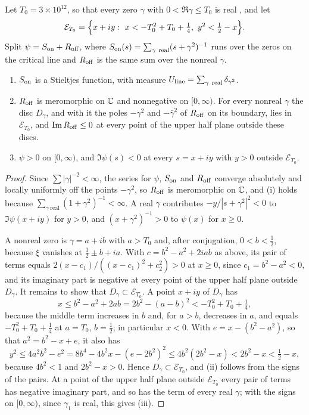 \begin{theorem}[unconditional]\label{bs:thm:local}
Let $T_0=3\times10^{12}$, so that every zero $\gamma$ with $0<\Re\gamma\le T_0$ is real \cite{PT21}, and let
\[
\mathcal E_{T_0}=\Bigl\{x+iy:\ x<-T_0^2+T_0+\tfrac14,\ y^2<\tfrac12-x\Bigr\}.
\]
Split $\psi=S_{\rm on}+R_{\rm off}$, where $S_{\rm on}(s)=\sum_{\gamma\ \mathrm{real}}(s+\gamma^2)^{-1}$ runs over the zeros on the critical line and $R_{\rm off}$ is the same sum over the nonreal $\gamma$.
\begin{enumerate}
\item[(i)] $S_{\rm on}$ is a Stieltjes function, with measure $U_{\rm line}=\sum_{\gamma\ \mathrm{real}}\delta_{\gamma^2}$.
\item[(ii)] $R_{\rm off}$ is meromorphic on $\C$ and nonnegative on $[0,\infty)$. For every nonreal $\gamma$ the disc $D_\gamma$, and with it the poles $-\gamma^2$ and $-\bar\gamma^2$ of $R_{\rm off}$ on its boundary, lies in $\mathcal E_{T_0}$, and $\Im R_{\rm off}\le0$ at every point of the upper half plane outside these discs.
\item[(iii)] $\psi>0$ on $[0,\infty)$, and $\Im\psi(s)<0$ at every $s=x+iy$ with $y>0$ outside $\mathcal E_{T_0}$.
\end{enumerate}
\end{theorem}

\begin{proof}
Since $\sum|\gamma|^{-2}<\infty$, the series for $\psi$, $S_{\rm on}$ and $R_{\rm off}$ converge absolutely and locally uniformly off the points $-\gamma^2$, so $R_{\rm off}$ is meromorphic on $\C$, and (i) holds because $\sum_{\gamma\ \mathrm{real}}(1+\gamma^2)^{-1}<\infty$. A real $\gamma$ contributes $-y/|s+\gamma^2|^2<0$ to $\Im\psi(x+iy)$ for $y>0$, and $(x+\gamma^2)^{-1}>0$ to $\psi(x)$ for $x\ge0$.

A nonreal zero is $\gamma=a+ib$ with $a>T_0$ and, after conjugation, $0<b<\frac12$, because $\xi$ vanishes at $\frac12\pm b+ia$. With $c=b^2-a^2+2iab$ as above, its pair of terms equals $2(x-c_1)/((x-c_1)^2+c_2^2)>0$ at $x\ge0$, since $c_1=b^2-a^2<0$, and its imaginary part is negative at every point of the upper half plane outside $D_\gamma$. It remains to show that $D_\gamma\subset\mathcal E_{T_0}$. A point $x+iy$ of $D_\gamma$ has
\[
x\le b^2-a^2+2ab=2b^2-(a-b)^2<-T_0^2+T_0+\tfrac14,
\]
because the middle term increases in $b$ and, for $a>b$, decreases in $a$, and equals $-T_0^2+T_0+\frac14$ at $a=T_0$, $b=\frac12$; in particular $x<0$. With $e=x-(b^2-a^2)$, so that $a^2=b^2-x+e$, it also has
\[
y^2\le4a^2b^2-e^2=8b^4-4b^2x-(e-2b^2)^2\le4b^2(2b^2-x)<2b^2-x<\tfrac12-x,
\]
because $4b^2<1$ and $2b^2-x>0$. Hence $D_\gamma\subset\mathcal E_{T_0}$, and (ii) follows from the signs of the pairs. At a point of the upper half plane outside $\mathcal E_{T_0}$ every pair of terms has negative imaginary part, and so has the term of every real $\gamma$; with the signs on $[0,\infty)$, since $\gamma_1$ is real, this gives (iii).
\end{proof}

